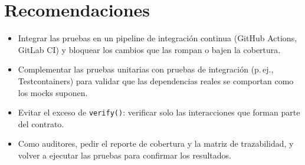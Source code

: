 \documentclass[11pt,a4paper,oneside]{report}
\newcommand{\code}[1]{\texttt{#1}}
\begin{document}
\section{Recomendaciones}
\begin{itemize}
  \item Integrar las pruebas en un pipeline de integración continua (GitHub Actions, GitLab CI) y bloquear los cambios que las rompan o bajen la cobertura.
  \item Complementar las pruebas unitarias con pruebas de integración (p.\,ej., Testcontainers) para validar que las dependencias reales se comportan como los mocks suponen.
  \item Evitar el exceso de \code{verify()}: verificar solo las interacciones que forman parte del contrato.
  \item Como auditores, pedir el reporte de cobertura y la matriz de trazabilidad, y volver a ejecutar las pruebas para confirmar los resultados.
\end{itemize}

\end{document}
